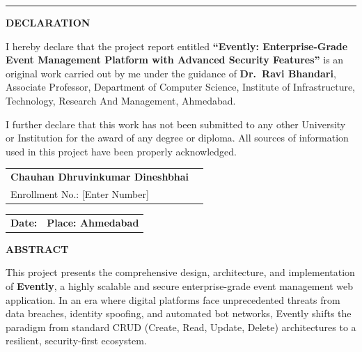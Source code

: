 \documentclass[12pt,a4paper]{report}
\begin{document}
\vspace{0.5cm}
\noindent\rule{\textwidth}{0.5pt}
\vspace{0.8cm}

\begin{center}
    {\Large \textbf{DECLARATION}}
\end{center}
\vspace{0.5cm}


I hereby declare that the project report entitled \textbf{``Evently: Enterprise-Grade Event Management Platform with Advanced Security Features''} is an original work carried out by me under the guidance of \textbf{Dr.\ Ravi Bhandari}, Associate Professor, Department of Computer Science, Institute of Infrastructure, Technology, Research And Management, Ahmedabad.

I further declare that this work has not been submitted to any other University or Institution for the award of any degree or diploma. All sources of information used in this project have been properly acknowledged.

\vspace{1cm}

\noindent
\begin{tabular}{p{7cm} p{7cm}}
\textbf{Chauhan Dhruvinkumar Dineshbhai} & \\
Enrollment No.: [Enter Number] & \\
\end{tabular}

\vspace{1cm}

\noindent
\begin{tabular}{p{7cm} p{7cm}}
\textbf{Date:} & \textbf{Place: Ahmedabad} \\
\end{tabular}


\clearpage
{}
{}
\begin{center}{\Large \textbf{ABSTRACT}}\end{center}
\vspace{0.5cm}

This project presents the comprehensive design, architecture, and implementation of \textbf{Evently}, a highly scalable and secure enterprise-grade event management web application. In an era where digital platforms face unprecedented threats from data breaches, identity spoofing, and automated bot networks, Evently shifts the paradigm from standard CRUD (Create, Read, Update, Delete) architectures to a resilient, security-first ecosystem.
\end{document}
